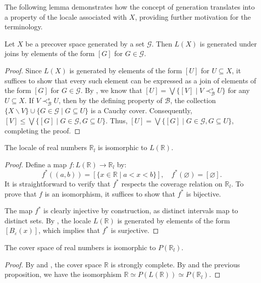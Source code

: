 \documentclass[reqno]{amsart}
\theoremstyle{definition}
\theoremstyle{remark}
\numberwithin{figure}{section}
\newcommand{\rb}{\prec}
\begin{document}
The following lemma demonstrates how the concept of generation translates into a property of the locale associated with $X$, providing further motivation for the terminology.

\begin{lem}
Let $X$ be a precover space generated by a set $\mathcal{G}$.
Then $L(X)$ is generated under joins by elements of the form $[G]$ for $G \in \mathcal{G}$.
\end{lem}
\begin{proof}
Since $L(X)$ is generated by elements of the form $[U]$ for $U \subseteq X$, it suffices to show that every such element can be expressed as a join of elements of the form $[G]$ for $G \in \mathcal{G}$.
By , we know that $[U] = \bigvee \{ [V] \mid V \rb^s_\mathcal{B} U \}$ for any $U \subseteq X$.
If $V \rb^s_\mathcal{B} U$, then by the defining property of $\mathcal{B}$, the collection $\{ X \backslash V \} \cup \{ G \in \mathcal{G} \mid G \subseteq U \}$ is a Cauchy cover.
Consequently, $[V] \leq \bigvee \{ [G] \mid G \in \mathcal{G}, G \subseteq U \}$.
Thus, $[U] = \bigvee \{ [G] \mid G \in \mathcal{G}, G \subseteq U \}$, completing the proof.
\end{proof}

\begin{prop}
The locale of real numbers $\mathbb{R}_l$ is isomorphic to $L(\mathbb{R})$.
\end{prop}
\begin{proof}
Define a map $f : L(\mathbb{R}) \to \mathbb{R}_l$ by:
\[ f^*((a,b)) = [\{ x \in \mathbb{R} \mid a < x < b \}], \quad f^*(\varnothing) = [\varnothing]. \]
It is straightforward to verify that $f^*$ respects the coverage relation on $\mathbb{R}_l$.
To prove that $f$ is an isomorphism, it suffices to show that $f^*$ is bijective.

The map $f^*$ is clearly injective by construction, as distinct intervals map to distinct sets.
By , the locale $L(\mathbb{R})$ is generated by elements of the form $[B_\varepsilon(x)]$, which implies that $f^*$ is surjective.
\end{proof}

\begin{cor}
The cover space of real numbers is isomorphic to $P(\mathbb{R}_l)$.
\end{cor}
\begin{proof}
By  and , the cover space $\mathbb{R}$ is strongly complete.
By  and the previous proposition, we have the isomorphism $\mathbb{R} \simeq P(L(\mathbb{R})) \simeq P(\mathbb{R}_l)$.
\end{proof}
\end{document}
